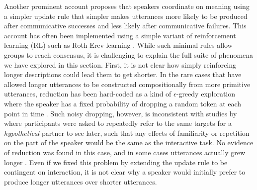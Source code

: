 Another prominent account proposes that speakers coordinate on meaning using a simpler update rule that simpler makes utterances more likely to be produced after communicative successes and less likely after communicative failures.
This account has often been implemented using a simple variant of reinforcement learning (RL) such as Roth-Erev learning \cite{erev1998predicting,steels_self-organizing_1995,barr_establishing_2004,young_evolution_2015}.
While such minimal rules allow groups to reach consensus, it is challenging to explain the full suite of phenomena we have explored in this section. 
First, it is not clear how simply reinforcing longer descriptions could lead them to get shorter. 
In the rare cases that have allowed longer utterances to be constructed compositionally from more primitive utterances, reduction has been hard-coded as a kind of $\epsilon$-greedy exploration where the speaker has a fixed probability of dropping a random token at each point in time \cite{beuls2013agent,steels2016agent}.
Such noisy dropping, however, is inconsistent with studies by  where participants were asked to repeatedly refer to the same targets for a \emph{hypothetical} partner to see later, such that any effects of familiarity or repetition on the part of the speaker would be the same as the interactive task.
No evidence of reduction was found in this case, and in some cases utterances actually grew longer \cite<see also>{GarrodFayLeeOberlanderMacLeod07_GraphicalSymbolSystems}.
Even if we fixed this problem by extending the update rule to be contingent on interaction, it is not clear why a speaker would initially prefer to produce longer utterances over shorter utterances.

